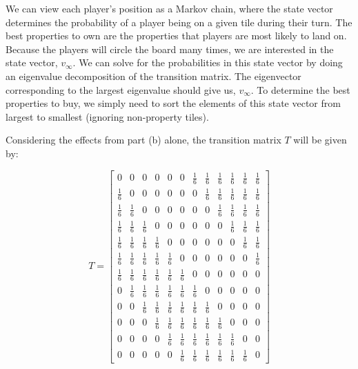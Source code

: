 \documentclass[fleqn]{article}
\begin{document}
\begin{enumerate}[nolistsep]
\begin{enumerate}
			We can view each player's position as a Markov chain, where the state vector determines the probability of a player being on a given tile during their turn. The best properties to own are the properties that players are most likely to land on. Because the players will circle the board many times, we are interested in the state vector, $v_{\infty}$. We can solve for the probabilities in this state vector by doing an eigenvalue decomposition of the transition matrix. The eigenvector corresponding to the largest eigenvalue should give us, $v_\infty$. To determine the best properties to buy, we simply need to sort the elements of this state vector from largest to smallest (ignoring non-property tiles).
			
			Considering the effects from part (b) alone, the transition matrix $T$ will be given by:
			
			\begin{equation*}
				T = \begin{bmatrix}
					0 & 0 & 0 & 0 & 0 & 0 & \frac{1}{6} & \frac{1}{6} & \frac{1}{6} & \frac{1}{6} & \frac{1}{6} & \frac{1}{6}\\[3pt]
					\frac{1}{6} & 0 & 0 & 0 & 0 & 0 & 0 & \frac{1}{6} & \frac{1}{6} & \frac{1}{6} & \frac{1}{6} & \frac{1}{6}\\[3pt]
					\frac{1}{6} & \frac{1}{6} & 0 & 0 & 0 & 0 & 0 & 0 & \frac{1}{6} & \frac{1}{6} & \frac{1}{6} & \frac{1}{6}\\[3pt]
					\frac{1}{6} & \frac{1}{6} & \frac{1}{6} & 0 & 0 & 0 & 0 & 0 & 0 & \frac{1}{6} & \frac{1}{6} & \frac{1}{6}\\[3pt]
					\frac{1}{6} & \frac{1}{6} & \frac{1}{6} & \frac{1}{6} & 0 & 0 & 0 & 0 & 0 & 0 & \frac{1}{6} & \frac{1}{6}\\[3pt]
					\frac{1}{6} & \frac{1}{6} & \frac{1}{6} & \frac{1}{6} & \frac{1}{6} & 0 & 0 & 0 & 0 & 0 & 0 & \frac{1}{6}\\[3pt]
					\frac{1}{6} & \frac{1}{6} & \frac{1}{6} & \frac{1}{6} & \frac{1}{6} & \frac{1}{6} & 0 & 0 & 0 & 0 & 0 & 0\\[3pt]
					0 & \frac{1}{6} & \frac{1}{6} & \frac{1}{6} & \frac{1}{6} & \frac{1}{6} & \frac{1}{6} & 0 & 0 & 0 & 0 & 0\\[3pt]
					0 & 0 & \frac{1}{6} & \frac{1}{6} & \frac{1}{6} & \frac{1}{6} & \frac{1}{6} & \frac{1}{6} & 0 & 0 & 0 & 0\\[3pt]
					0 & 0 & 0 & \frac{1}{6} & \frac{1}{6} & \frac{1}{6} & \frac{1}{6} & \frac{1}{6} & \frac{1}{6} & 0 & 0 & 0\\[3pt]
					0 & 0 & 0 & 0 & \frac{1}{6} & \frac{1}{6} & \frac{1}{6} & \frac{1}{6} & \frac{1}{6} & \frac{1}{6} & 0 & 0\\[3pt]
					0 & 0 & 0 & 0 & 0 & \frac{1}{6} & \frac{1}{6} & \frac{1}{6} & \frac{1}{6} & \frac{1}{6} & \frac{1}{6} & 0
				\end{bmatrix}
			\end{equation*}
			

\end{enumerate}
\end{enumerate}
\end{document}
